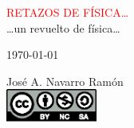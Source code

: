 %
%

\newcommand*{\titleTH}{\begingroup%
\raggedleft
\vspace*{\baselineskip}
{\textcolor{red}{\Huge RETAZOS DE FÍSICA\dots}}\\[\baselineskip]
{\large\dots un revuelto de física\dots}\par
\vspace{2ex}
{\large\today}\par
\vspace{10ex}
{\Large José A. Navarro Ramón}\\[0.167\textheight]
\vspace{20ex}
{\Large \includegraphics[width=3.0cm]{./img/static/Cc-by-nc-sa_icon.eps}}\par
\vspace*{3\baselineskip}
\endgroup}

\titleTH




